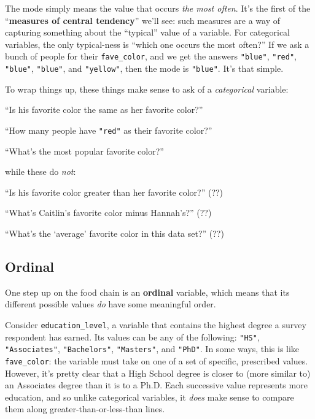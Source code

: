 The mode simply means the value that occurs \textit{the most often}. It's the
first of the ``\textbf{measures of central tendency}'' we'll see: such measures
are a way of capturing something about the ``typical'' value of a variable. For
categorical variables, the only typical-ness is ``which one occurs the most
often?'' If we ask a bunch of people for their \texttt{fave\_color}, and we get
the answers \texttt{"blue"}, \texttt{"red"}, \texttt{"blue"}, \texttt{"blue"},
and \texttt{"yellow"}, then the mode is \texttt{"blue"}. It's that simple.

To wrap things up, these things make sense to ask of a \textit{categorical}
variable:

\begin{compactitem}
\item[\leftthumbsup] ``Is his favorite color the same as her favorite color?''
\item[\leftthumbsup] ``How many people have \texttt{"red"} as their favorite
color?''
\item[\leftthumbsup] ``What's the most popular favorite color?''
\end{compactitem}

while these do \textit{not}:

\begin{compactitem}
\item[\leftthumbsdown] ``Is his favorite color greater than her favorite
color?'' (??)
\item[\leftthumbsdown] ``What's Caitlin's favorite color minus Hannah's?'' (??)
\item[\leftthumbsdown] ``What's the `average' favorite color in this data
set?'' (??)
\end{compactitem}


\subsection{Ordinal}

One step up on the food chain is an \textbf{ordinal} variable, which means that
its different possible values \textit{do} have some meaningful order.

Consider \texttt{education\_level}, a variable that contains the highest degree
a survey respondent has earned. Its values can be any of the following:
\texttt{"HS"}, \texttt{"Associates"}, \texttt{"Bachelors"}, \texttt{"Masters"},
and \texttt{"PhD"}. In some ways, this is like \texttt{fave\_color}: the
variable must take on one of a set of specific, prescribed values. However,
it's pretty clear that a High School degree is closer to (more similar to) an
Associates degree than it is to a Ph.D. Each successive value represents more
education, and so unlike categorical variables, it \textit{does} make sense to
compare them along greater-than-or-less-than lines.


